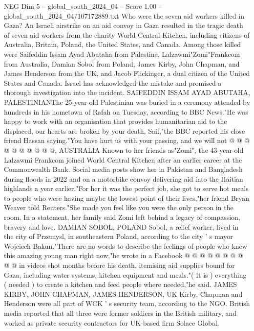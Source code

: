 \begin{textsample}{NEG Dim 5 – global\_south\_2024\_04 – Score 1.00 – global\_south\_2024\_04/107172889.txt}  \label{ex:f5_neg_185}
Who were the seven aid workers killed in Gaza?
An Israeli airstrike on an aid convoy in Gaza resulted in the tragic death of seven aid workers from the charity World Central Kitchen, including citizens of Australia, Britain, Poland, the United States, and Canada.
Among those killed were Saifeddin Issam Ayad Abutaha from Palestine, Lalzawmi"Zomi"Frankcom from Australia, Damian Sobol from Poland, James Kirby, John Chapman, and James Henderson from the UK, and Jacob Flickinger, a dual citizen of the United States and Canada.
Israel has acknowledged the mistake and promised a thorough investigation into the incident.
SAIFEDDIN ISSAM AYAD ABUTAHA, PALESTINIANThe 25-year-old Palestinian was buried in a ceremony attended by hundreds in his hometown of Rafah on Tuesday, according to BBC News."He was happy to work with an organisation that provides humanitarian aid to the displaced, our hearts are broken by your death, Saif,"the BBC reported his close friend Hassan saying."You have hurt us with your passing, and we will not @ @ @ @ @ @ @ @ @ @, AUSTRALIA Known to her friends as"Zomi", the 43-year-old Lalzawmi Frankcom joined World Central Kitchen after an earlier career at the Commonwealth Bank.
Social media posts show her in Pakistan and Bangladesh during floods in 2022 and on a motorbike convoy delivering aid into the Haitian highlands a year earlier."For her it was the perfect job, she got to serve hot meals to people who were having maybe the lowest point of their lives,"her friend Bryan Weaver told Reuters."She made you feel like you were the only person in the room.
In a statement, her family said Zomi left behind a legacy of compassion, bravery and love.
DAMIAN SOBOL, POLAND Sobol, a relief worker, lived in the city of Przemysl, in southeastern Poland, according to the city ' s mayor Wojciech Bakun."There are no words to describe the feelings of people who knew this amazing young man right now,"he wrote in a Facebook @ @ @ @ @ @ @ @ @ @ in videos shot months before his death, itemising aid supplies bound for Gaza, including water systems, kitchen equipment and meals."( It is ) everything ( needed ) to create a kitchen and feed people where needed,"he said.
JAMES KIRBY, JOHN CHAPMAN, JAMES HENDERSON, UK Kirby, Chapman and Henderson were all part of WCK ' s security team, according to the NGO.
British media reported that all three were former soldiers in the British military, and worked as private security contractors for UK-based firm Solace Global.

\end{textsample}
